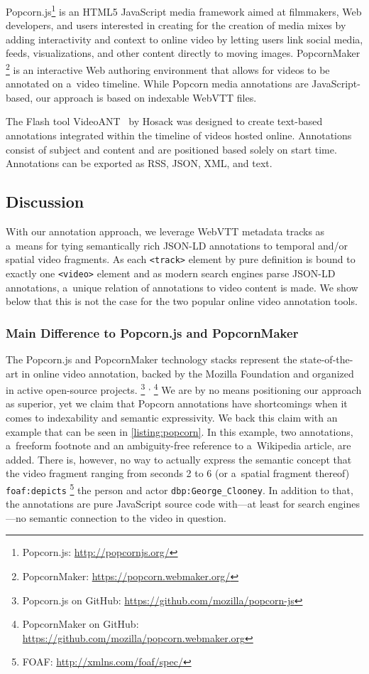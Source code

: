 \documentclass[runningheads,a4paper]{llncs}
\newcommand{\inlinelistingsize}{\fontsize{8pt}{11pt}}
\let\oldurl\url
\renewcommand{\url}[1]{\inlinelistingsize\oldurl{#1}}
\begin{document}
Popcorn.js\footnote{Popcorn.js: \url{http://popcornjs.org/}}
is an HTML5 JavaScript media framework
aimed at filmmakers, Web developers,
and users interested in creating
for the creation of media mixes
by adding interactivity and context to online video
by letting users link social media, feeds,
visualizations, and other content directly to moving images.
PopcornMaker%
\footnote{PopcornMaker: \url{https://popcorn.webmaker.org/}}
is an interactive Web authoring environment
that allows for videos to be annotated on a~video timeline.
While Popcorn media annotations are JavaScript-based,
our approach is based on indexable WebVTT files.

The Flash tool VideoANT~\cite{hosack2010videoant} by Hosack
was designed to create text-based annotations
integrated within the timeline of videos hosted online.
Annotations consist of subject and content and
are positioned based solely on start time.
Annotations can be exported as RSS, JSON, XML, and text.

\subsection{Discussion}

With our annotation approach, we leverage WebVTT
metadata tracks as a~means for tying semantically rich JSON-LD annotations
to temporal and/or spatial video fragments.
As each \texttt{<track>} element by pure definition is bound to
exactly one \texttt{<video>} element and as modern search engines
parse JSON-LD annotations,
a~unique relation of annotations to video content is made.
We show below that this is not the case for the two
popular online video annotation tools.

\subsubsection{Main Difference to Popcorn.js and PopcornMaker}

The Popcorn.js and PopcornMaker technology stacks
represent the state-of-the-art in online video annotation,
backed by the Mozilla Foundation
and organized in active open-source projects.%
\footnote{Popcorn.js on GitHub: \url{https://github.com/mozilla/popcorn-js}}%
\textsuperscript{,}%
\footnote{PopcornMaker on GitHub: \url{https://github.com/mozilla/popcorn.webmaker.org}}
We are by no means positioning our approach as superior,
yet we claim that Popcorn annotations have shortcomings
when it comes to indexability and semantic expressivity. 
We back this claim with an example
that can be seen in \autoref{listing:popcorn}.
In this example, two annotations, a~freeform footnote 
and an ambiguity-free reference to a~Wikipedia article, are added.
There is, however, no way to actually express the semantic concept
that the video fragment ranging from seconds 2 to 6 (or a~spatial fragment thereof) 
\texttt{foaf:depicts}%
\footnote{FOAF: \url{http://xmlns.com/foaf/spec/}} the person and actor
\texttt{dbp:George\_Clooney}.
In addition to that, the annotations are pure JavaScript source code
with---at least for search engines---no semantic connection
to the video in question.
\end{document}
